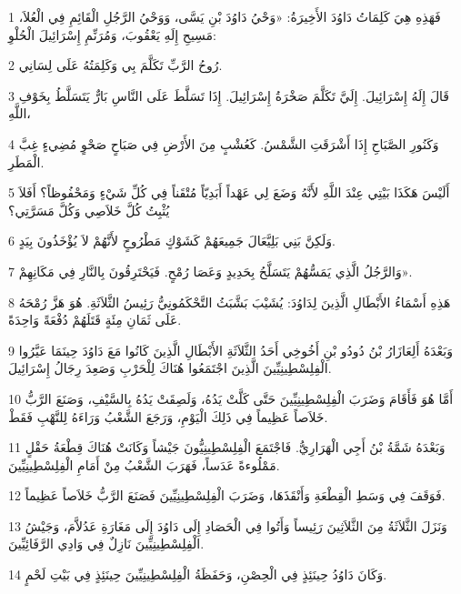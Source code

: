 \par 1 فَهَذِهِ هِيَ كَلِمَاتُ دَاوُدَ الأَخِيرَةُ: «وَحْيُ دَاوُدَ بْنِ يَسَّى، وَوَحْيُ الرَّجُلِ الْقَائِمِ فِي الْعُلاَ، مَسِيحِ إِلَهِ يَعْقُوبَ، وَمُرَنِّمِ إِسْرَائِيلَ الْحُلْوِ:
\par 2 رُوحُ الرَّبِّ تَكَلَّمَ بِي وَكَلِمَتُهُ عَلَى لِسَانِي.
\par 3 قَالَ إِلَهُ إِسْرَائِيلَ. إِلَيَّ تَكَلَّمَ صَخْرَةُ إِسْرَائِيلَ. إِذَا تَسَلَّطَ عَلَى النَّاسِ بَارٌّ يَتَسَلَّطُ بِخَوْفِ اللَّهِ،
\par 4 وَكَنُورِ الصَّبَاحِ إِذَا أَشْرَقَتِ الشَّمْسُ. كَعُشْبٍ مِنَ الأَرْضِ فِي صَبَاحٍ صَحْوٍ مُضِيءٍ غِبَّ الْمَطَرِ.
\par 5 أَلَيْسَ هَكَذَا بَيْتِي عِنْدَ اللَّهِ لأَنَّهُ وَضَعَ لِي عَهْداً أَبَدِيّاً مُتْقَناً فِي كُلِّ شَيْءٍ وَمَحْفُوظاً؟ أَفَلاَ يُثْبِتُ كُلَّ خَلاَصِي وَكُلَّ مَسَرَّتِي؟
\par 6 وَلَكِنَّ بَنِي بَلِيَّعَالَ جَمِيعَهُمْ كَشَوْكٍ مَطْرُوحٍ لأَنَّهُمْ لاَ يُؤْخَذُونَ بِيَدٍ.
\par 7 وَالرَّجُلُ الَّذِي يَمَسُّهُمْ يَتَسَلَّحُ بِحَدِيدٍ وَعَصَا رُمْحٍ. فَيَحْتَرِقُونَ بِالنَّارِ فِي مَكَانِهِمْ».
\par 8 هَذِهِ أَسْمَاءُ الأَبْطَالِ الَّذِينَ لِدَاوُدَ: يُشَيْبَ بَشَّبَثُ التَّحْكَمُونِيُّ رَئِيسُ الثَّلاَثَةِ. هُوَ هَزَّ رُمْحَهُ عَلَى ثَمَانِ مِئَةٍ قَتَلَهُمْ دُفْعَةً وَاحِدَةً.
\par 9 وَبَعْدَهُ أَلِعَازَارُ بْنُ دُودُو بْنِ أَخُوخِي أَحَدُ الثَّلاَثَةِ الأَبْطَالِ الَّذِينَ كَانُوا مَعَ دَاوُدَ حِينَمَا عَيَّرُوا الْفِلِسْطِينِيِّينَ الَّذِينَ اجْتَمَعُوا هُنَاكَ لِلْحَرْبِ وَصَعِدَ رِجَالُ إِسْرَائِيلَ.
\par 10 أَمَّا هُوَ فَأَقَامَ وَضَرَبَ الْفِلِسْطِينِيِّينَ حَتَّى كَلَّتْ يَدُهُ، وَلَصِقَتْ يَدُهُ بِالسَّيْفِ، وَصَنَعَ الرَّبُّ خَلاَصاً عَظِيماً فِي ذَلِكَ الْيَوْمِ، وَرَجَعَ الشَّعْبُ وَرَاءَهُ لِلنَّهْبِ فَقَطْ.
\par 11 وَبَعْدَهُ شَمَّةُ بْنُ أَجِي الْهَرَارِيُّ. فَاجْتَمَعَ الْفِلِسْطِينِيُّونَ جَيْشاً وَكَانَتْ هُنَاكَ قِطْعَةُ حَقْلٍ مَمْلُوءةً عَدَساً، فَهَرَبَ الشَّعْبُ مِنْ أَمَامِ الْفِلِسْطِينِيِّينَ.
\par 12 فَوَقَفَ فِي وَسَطِ الْقِطْعَةِ وَأَنْقَذَهَا، وَضَرَبَ الْفِلِسْطِينِيِّينَ فَصَنَعَ الرَّبُّ خَلاَصاً عَظِيماً.
\par 13 وَنَزَلَ الثَّلاَثَةُ مِنَ الثَّلاَثِينَ رَئِيساً وَأَتُوا فِي الْحَصَادِ إِلَى دَاوُدَ إِلَى مَغَارَةِ عَدُلاَّمَ، وَجَيْشُ الْفِلِسْطِينِيِّينَ نَازِلٌ فِي وَادِي الرَّفَائِيِّينَ.
\par 14 وَكَانَ دَاوُدُ حِينَئِذٍ فِي الْحِصْنِ، وَحَفَظَةُ الْفِلِسْطِينِيِّينَ حِينَئِذٍ فِي بَيْتِ لَحْمٍ.
